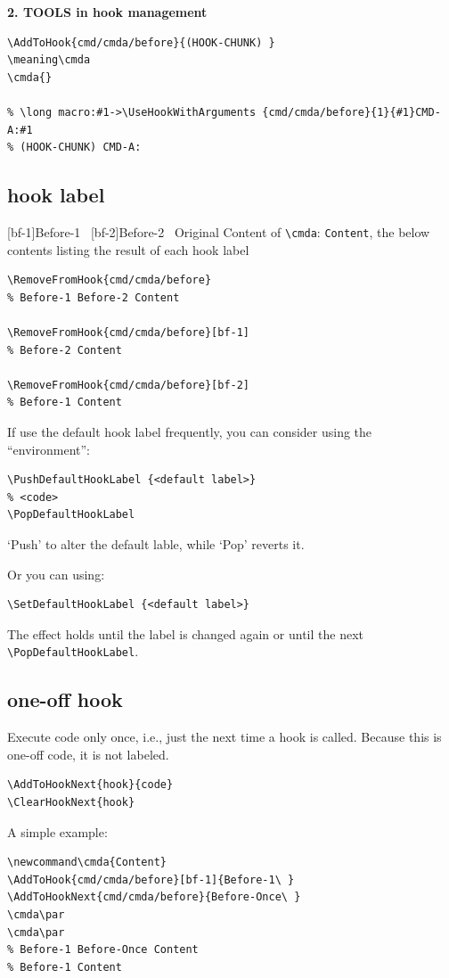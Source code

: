 \documentclass{article}
\newcommand\tbh{\textbackslash}
\newcommand\cmda{Content}
\begin{document}
\textbf{2. TOOLS in hook management}
\begin{lstlisting}
\AddToHook{cmd/cmda/before}{(HOOK-CHUNK) }
\meaning\cmda
\cmda{}

% \long macro:#1->\UseHookWithArguments {cmd/cmda/before}{1}{#1}CMD-A:#1
% (HOOK-CHUNK) CMD-A:
\end{lstlisting}

\subsection{hook label}
[bf-1]{Before-1\ }
[bf-2]{Before-2\ }
\quad Original Content of \texttt{\tbh cmda}: \texttt{\cmda}, the below contents listing the result of each hook label\par

\begin{lstlisting}
\RemoveFromHook{cmd/cmda/before}
% Before-1 Before-2 Content

\RemoveFromHook{cmd/cmda/before}[bf-1]
% Before-2 Content

\RemoveFromHook{cmd/cmda/before}[bf-2]
% Before-1 Content
\end{lstlisting}

If use the default hook label frequently, you can consider using the ``environment'':
\begin{lstlisting}
\PushDefaultHookLabel {<default label>}
% <code>
\PopDefaultHookLabel
\end{lstlisting}

`Push' to alter the default lable, while `Pop' reverts it.

Or you can using:
\begin{lstlisting}
\SetDefaultHookLabel {<default label>}
\end{lstlisting}

The effect holds until the label is changed again or until the next \texttt{\tbh PopDefaultHookLabel}.

\subsection{one-off hook}
Execute code only once, i.e., just the next time a hook is called. Because this is one-off code, it is
not labeled.
\begin{lstlisting}
\AddToHookNext{hook}{code}
\ClearHookNext{hook}
\end{lstlisting}

A simple example:
\begin{lstlisting}
\newcommand\cmda{Content}
\AddToHook{cmd/cmda/before}[bf-1]{Before-1\ }
\AddToHookNext{cmd/cmda/before}{Before-Once\ }
\cmda\par
\cmda\par
% Before-1 Before-Once Content
% Before-1 Content
\end{lstlisting}
\end{document}
